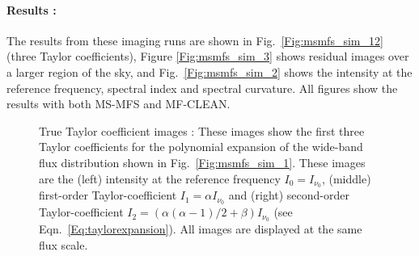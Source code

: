 \documentclass[structabstract]{stylefiles/aa}
\newcommand{\I}{{\vec{I}}}
\begin{document}
\paragraph{Results : }
The results from these imaging runs are shown in %
Fig.~\ref{Fig:msmfs_sim_12} (three Taylor coefficients), 
Figure \ref{Fig:msmfs_sim_3} shows residual images 
over a larger region of the sky, and Fig.~\ref{Fig:msmfs_sim_2} shows the
intensity at the reference frequency, spectral index and spectral curvature.
All figures show the results with both MS-MFS and MF-CLEAN. 


%
\begin{figure}[t!]
\caption[Example : Simulated wide-band sky brightness distribution]
{\small Simulated wide-band sky brightness distribution : 
These images represent the wide-band sky brightness distribution that was
used to simulate EVLA data to test the MS-MFS algorithm. 
The image on the top left shows the
total intensity image of the source at the reference frequency $\I_{\nu_0}$. The plots
on the bottom left show spectra (and their power law parameters) at 4 different locations.
The spectral index varies smoothly between about $+$1 and $-$1 across the extended source 
and is $-$2.5 for the point source. 
The spectral curvature has significant values only in the central region of the extended source
where the spectrum turns over within the sampled range.
The images on the right show these trends in the form of spectral index (top) and
spectral curvature (bottom) maps. 
}
\label{Fig:msmfs_sim_1}
\vspace*{0.5cm}
\caption[Example : True Taylor coefficient images]
{\small True Taylor coefficient images :
These images show the first three Taylor coefficients for the polynomial expansion
of the wide-band flux distribution shown in Fig.~\ref{Fig:msmfs_sim_1}.
These images are the (left) intensity at the reference frequency $I_{0} = I_{\nu_0}$,
(middle) first-order Taylor-coefficient $I_1 = \alpha I_{\nu_0}$
and (right) second-order Taylor-coefficient 
$I_2 = \left({\alpha(\alpha-1)}/{2} + \beta \right) I_{\nu_0}$ 
(see Eqn.~\ref{Eq:taylorexpansion}). All images are displayed at the same flux scale.
}
\label{Fig:msmfs_sim_11}
\end{figure}
\end{document}
